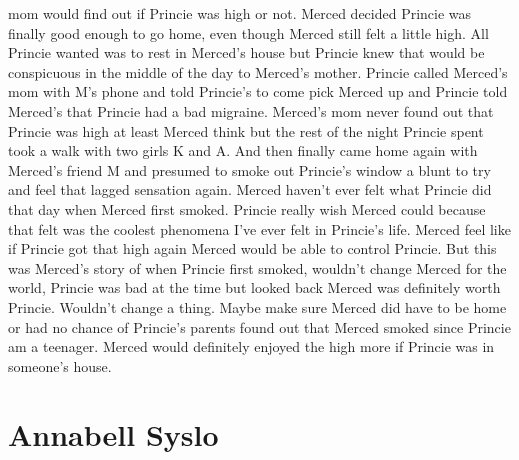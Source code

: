 \documentclass[12pt]{book}
\begin{document}
mom would find out if Princie was high or not. Merced decided Princie was finally good enough to go home, even though Merced still felt a little high. All Princie wanted was to rest in Merced's house but Princie knew that would be conspicuous in the middle of the day to Merced's mother. Princie called Merced's mom with M's phone and told Princie's to come pick Merced up and Princie told Merced's that Princie had a bad migraine. Merced's mom never found out that Princie was high at least Merced think but the rest of the night Princie spent took a walk with two girls K and A. And then finally came home again with Merced's friend M and presumed to smoke out Princie's window a blunt to try and feel that lagged sensation again. Merced haven't ever felt what Princie did that day when Merced first smoked. Princie really wish Merced could because that felt was the coolest phenomena I've ever felt in Princie's life. Merced feel like if Princie got that high again Merced would be able to control Princie. But this was Merced's story of when Princie first smoked, wouldn't change Merced for the world, Princie was bad at the time but looked back Merced was definitely worth Princie. Wouldn't change a thing. Maybe make sure Merced did have to be home or had no chance of Princie's parents found out that Merced smoked since Princie am a teenager. Merced would definitely enjoyed the high more if Princie was in someone's house.



\chapter{Annabell Syslo}
\end{document}
